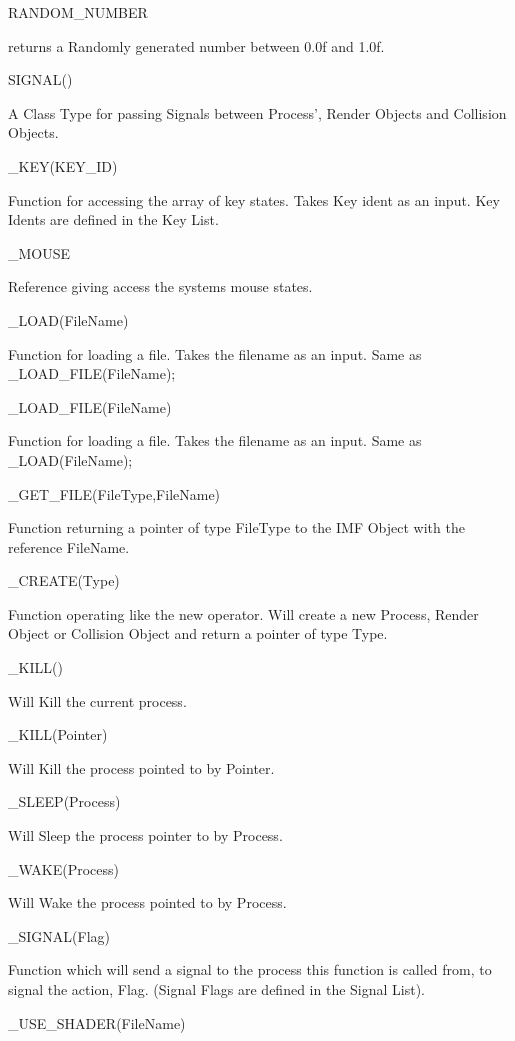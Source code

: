 \par
 RANDOM\_\-NUMBER
\begin{DoxyItemize}
\item returns a Randomly generated number between 0.0f and 1.0f.\par
 SIGNAL()
\item A Class Type for passing Signals between Process', Render Objects and Collision Objects.\par
 \_\-KEY(KEY\_\-ID)
\item Function for accessing the array of key states. Takes Key ident as an input. Key Idents are defined in the Key List.\par
 \_\-MOUSE
\item Reference giving access the systems mouse states.\par
 \_\-LOAD(FileName)
\item Function for loading a file. Takes the filename as an input. Same as \_\-LOAD\_\-FILE(FileName);\par
 \_\-LOAD\_\-FILE(FileName)
\item Function for loading a file. Takes the filename as an input. Same as \_\-LOAD(FileName);\par
 \_\-GET\_\-FILE(FileType,FileName)
\item Function returning a pointer of type FileType to the IMF Object with the reference FileName.\par
 \_\-CREATE(Type)
\item Function operating like the new operator. Will create a new Process, Render Object or Collision Object and return a pointer of type Type.\par
 \_\-KILL()
\item Will Kill the current process.\par
 \_\-KILL(Pointer)
\item Will Kill the process pointed to by Pointer.\par
 \_\-SLEEP(Process)
\item Will Sleep the process pointer to by Process.\par
 \_\-WAKE(Process)
\item Will Wake the process pointed to by Process.\par
 \_\-SIGNAL(Flag)
\item Function which will send a signal to the process this function is called from, to signal the action, Flag. (Signal Flags are defined in the Signal List).\par
 \_\-USE\_\-SHADER(FileName)

\end{DoxyItemize}
